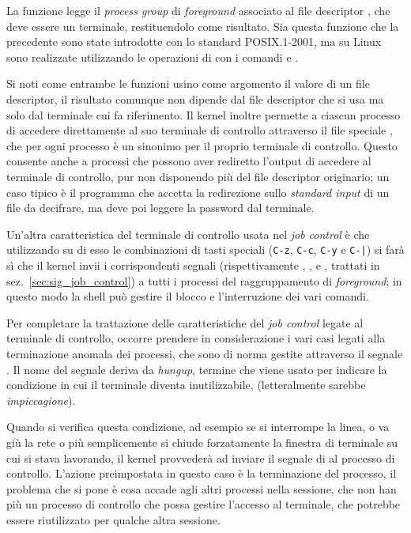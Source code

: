 La funzione legge il \textit{process group} di \textit{foreground} associato
al file descriptor , che deve essere un terminale, restituendolo
come risultato. Sia questa funzione che la precedente sono state introdotte
con lo standard POSIX.1-2001, ma su Linux sono realizzate utilizzando le
operazioni di  con i comandi  e
.

Si noti come entrambe le funzioni usino come argomento il valore di un file
descriptor, il risultato comunque non dipende dal file descriptor che si usa
ma solo dal terminale cui fa riferimento. Il kernel inoltre permette a ciascun
processo di accedere direttamente al suo terminale di controllo attraverso il
file speciale , che per ogni processo è un sinonimo per il
proprio terminale di controllo. Questo consente anche a processi che possono
aver rediretto l'output di accedere al terminale di controllo, pur non
disponendo più del file descriptor originario; un caso tipico è il programma
 che accetta la redirezione sullo \textit{standard input} di un
file da decifrare, ma deve poi leggere la password dal terminale.

Un'altra caratteristica del terminale di controllo usata nel \textit{job
  control} è che utilizzando su di esso le combinazioni di tasti speciali
(\texttt{C-z}, \texttt{C-c}, \texttt{C-y} e \texttt{C-|}) si farà sì che il
kernel invii i corrispondenti segnali (rispettivamente ,
,  e , trattati in
sez.~\ref{sec:sig_job_control}) a tutti i processi del raggruppamento di
\textit{foreground}; in questo modo la shell può gestire il blocco e
l'interruzione dei vari comandi.

Per completare la trattazione delle caratteristiche del \textit{job control}
legate al terminale di controllo, occorre prendere in considerazione i vari
casi legati alla terminazione anomala dei processi, che sono di norma gestite
attraverso il segnale . Il nome del segnale deriva da
\textit{hungup}, termine che viene usato per indicare la condizione in cui il
terminale diventa inutilizzabile, (letteralmente sarebbe
\textsl{impiccagione}).

Quando si verifica questa condizione, ad esempio se si interrompe la linea, o
va giù la rete o più semplicemente si chiude forzatamente la finestra di
terminale su cui si stava lavorando, il kernel provvederà ad inviare il
segnale di  al processo di controllo. L'azione preimpostata in
questo caso è la terminazione del processo, il problema che si pone è cosa
accade agli altri processi nella sessione, che non han più un processo di
controllo che possa gestire l'accesso al terminale, che potrebbe essere
riutilizzato per qualche altra sessione.

